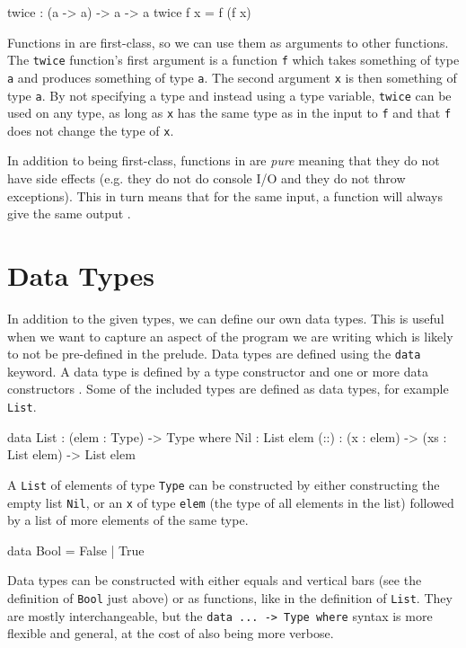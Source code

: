     \begin{code}[caption={A function with a function as an argument}]
        twice : (a -> a) -> a -> a
        twice f x = f (f x)
    \end{code}
    
    Functions in \Idris are first-class, so we can use them as arguments to other functions. The \texttt{twice} function's first argument is a function \texttt{f} which takes something of type \texttt{a} and produces something of type \texttt{a}. The second argument \texttt{x} is then something of type \texttt{a}. By not specifying a type and instead using a type variable, \texttt{twice} can be used on any type, as long as \texttt{x} has the same type as in the input to \texttt{f} and that \texttt{f} does not change the type of \texttt{x}.
    
    In addition to being first-class, functions in \Idris are \textit{pure} meaning that they do not have side effects (e.g. they do not do console I/O and they do not throw exceptions). This in turn means that for the same input, a function will always give the same output \cite{brady_2017}.


\section{Data Types}
    In addition to the given types, we can define our own data types. This is useful when we want to capture an aspect of the program we are writing which is likely to not be pre-defined in the \Idris prelude. Data types are defined using the \texttt{data} keyword. A data type is defined by a type constructor and one or more data constructors \cite{brady_2017}. Some of the included types are defined as data types, for example \texttt{List}.
    
    \begin{code}[caption={\texttt{List} as defined in the \Idris prelude}]
        data List : (elem : Type) -> Type where
            Nil  : List elem
            (::) : (x : elem) -> (xs : List elem) -> List elem 
    \end{code}
    A \texttt{List} of elements of type \texttt{Type} can be constructed by either constructing the empty list \texttt{Nil}, or an \texttt{x} of type \texttt{elem} (the type of all elements in the list) followed by a list of more elements of the same type.
    
    \begin{code}[caption={\texttt{Bool} as defined in the \Idris prelude}]
        data Bool = False
                  | True
    \end{code}
    Data types can be constructed with either equals and vertical bars (see the definition of \texttt{Bool} just above) or as functions, like in the definition of \texttt{List}. They are mostly interchangeable, but the \texttt{data ... -> Type where} syntax is more flexible and general, at the cost of also being more verbose.
    \\
    
